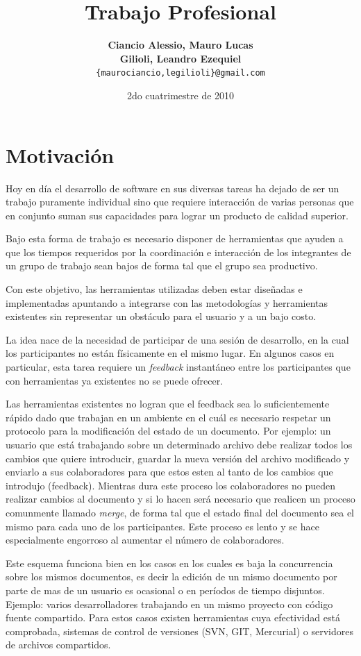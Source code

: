 \documentclass[12pt,a4paper]{article}
\title { \textbf{Trabajo Profesional}}
\date{2do cuatrimestre de 2010}
\author{\textbf{Ciancio Alessio, Mauro Lucas} \\
		\textbf{Gilioli, Leandro Ezequiel}	  \\
		\texttt{\{maurociancio,legilioli\}@gmail.com}
	}
\begin{document}
\maketitle
\tableofcontents
\newpage

	\section{Motivación}
Hoy en día el desarrollo de software en sus diversas tareas ha dejado de ser un trabajo 
puramente individual sino que requiere interacción de varias personas que en conjunto 
suman sus capacidades para lograr un producto de calidad superior.

Bajo esta forma de trabajo es necesario disponer de herramientas que ayuden a que los tiempos
requeridos por la coordinación e interacción de los integrantes de un grupo de trabajo sean bajos
de forma tal que el grupo sea productivo.

Con este objetivo, las herramientas utilizadas deben estar diseñadas e implementadas apuntando a
integrarse con las metodologías y herramientas existentes sin representar un obstáculo para el usuario
y a un bajo costo.

La idea nace de la necesidad de participar de una sesión de desarrollo, en la cual los participantes
no están físicamente en el mismo lugar. En algunos casos en particular, esta tarea requiere un
\textit{feedback} instantáneo entre los participantes que con herramientas ya existentes no se puede 
ofrecer.

Las herramientas existentes no logran que el feedback sea lo suficientemente rápido dado que trabajan
en un ambiente en el cuál es necesario respetar un protocolo para la modificación del estado de un 
documento. Por ejemplo: un usuario que está trabajando sobre un determinado archivo debe realizar todos
los cambios que quiere introducir, guardar la nueva versión del archivo modificado y enviarlo a sus
colaboradores para que estos esten al tanto de los cambios que introdujo (feedback). Mientras dura
este proceso los colaboradores no pueden realizar cambios al documento y si lo hacen será necesario
que realicen un proceso comunmente llamado \textit{merge}, de forma tal que el estado final del documento 
sea el mismo para cada uno de los participantes. Este proceso es lento y se hace especialmente engorroso
al aumentar el número de colaboradores.

Este esquema funciona bien en los casos en los cuales es baja la concurrencia sobre los mismos documentos,
es decir la edición de un mismo documento por parte de mas de un usuario es ocasional o en períodos de
tiempo disjuntos. Ejemplo: varios desarrolladores trabajando en un mismo proyecto con código fuente
compartido. Para estos casos existen herramientas cuya efectividad está comprobada, sistemas de control
de versiones (SVN, GIT, Mercurial) o servidores de archivos compartidos.
\end{document}
